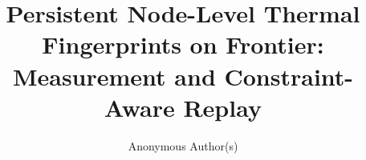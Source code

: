 \documentclass[acmsmall,screen,review]{acmart}
\title{Persistent Node-Level Thermal Fingerprints on Frontier: %
       Measurement and Constraint-Aware Replay}
\author{Anonymous Author(s)}
\affiliation{\institution{Anonymous Institution}}
\begin{document}
\begin{abstract}

\end{abstract}

\maketitle













\end{document}
